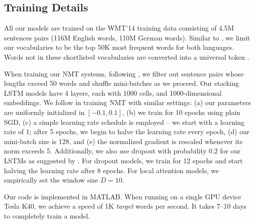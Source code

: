 \subsection{Training Details}
All our models are trained on the WMT'14 training data consisting of 4.5M
sentences pairs (116M English words, 110M German words). Similar to \cite{jean15}, we limit our vocabularies to be the top 50K most frequent words for both languages. Words not in these shortlisted vocabularies are converted into a universal token \unk{}. 


When training our NMT systems, following \cite{bog15,jean15}, we filter out
sentence pairs whose lengths exceed 50 words and shuffle mini-batches as we
proceed. Our stacking LSTM models have 4 layers, each with 1000 cells, and
1000-dimensional embeddings. We follow \cite{sutskever14,luong15} in training
NMT with similar settings: (a) our parameters are uniformly initialized in
$[-0.1, 0.1]$, (b) we train for 10 epochs using plain SGD, (c) a simple learning
rate schedule is employed -- we start with a learning rate of 1; after 5 epochs,
we begin to halve the learning rate every epoch, (d) our mini-batch size is 128,
and (e) the normalized gradient is rescaled whenever its norm exceeds 5.
Additionally, we also use dropout with probability $0.2$ for our LSTMs as suggested by
\cite{zaremba15}. For dropout models, we train for 12 epochs and start halving
the learning rate after 8 epochs. For local
attention models, we empirically set the window size $D=10$.

Our code is implemented in MATLAB. %
When running on a single GPU device Tesla K40, we achieve a speed of 1K {\it
target} words per second. It takes 7--10 days to completely train a model.

